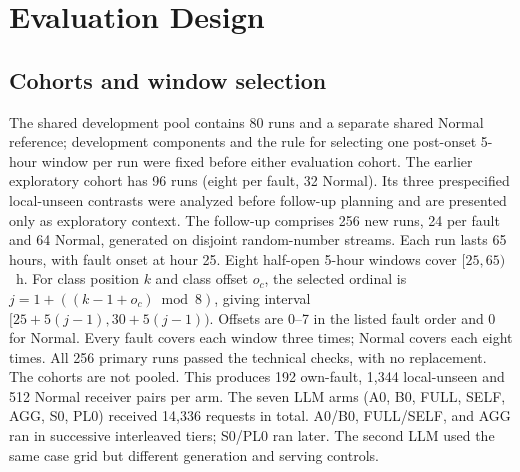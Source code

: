 \documentclass[conference]{IEEEtran}
\newcommand{\cond}[1]{\textsf{#1}}
\begin{document}
\section{Evaluation Design}
\label{sec:protocol}
\subsection{Cohorts and window selection}
The shared development pool contains 80 runs and a separate shared Normal reference; development components and the rule for selecting one post-onset 5-hour window per run were fixed before either evaluation cohort. The earlier exploratory cohort has 96 runs (eight per fault, 32 Normal). Its three prespecified local-unseen contrasts were analyzed before follow-up planning and are presented only as exploratory context. The follow-up comprises 256 new runs, 24 per fault and 64 Normal, generated on disjoint random-number streams. Each run lasts 65 hours, with fault onset at hour 25. Eight half-open 5-hour windows cover $[25,65)$~h. For class position $k$ and class offset $o_c$, the selected ordinal is $j=1+((k-1+o_c)\bmod 8)$, giving interval $[25+5(j-1),30+5(j-1))$. Offsets are 0--7 in the listed fault order and 0 for Normal. Every fault covers each window three times; Normal covers each eight times. All 256 primary runs passed the technical checks, with no replacement. The cohorts are not pooled. This produces 192 own-fault, 1,344 local-unseen and 512 Normal receiver pairs per arm. The seven LLM arms (\cond{A0}, \cond{B0}, \cond{FULL}, \cond{SELF}, \cond{AGG}, \cond{S0}, \cond{PL0}) received 14,336 requests in total. \cond{A0}/\cond{B0}, \cond{FULL}/\cond{SELF}, and \cond{AGG} ran in successive interleaved tiers; \cond{S0}/\cond{PL0} ran later. The second LLM used the same case grid but different generation and serving controls.
\end{document}
